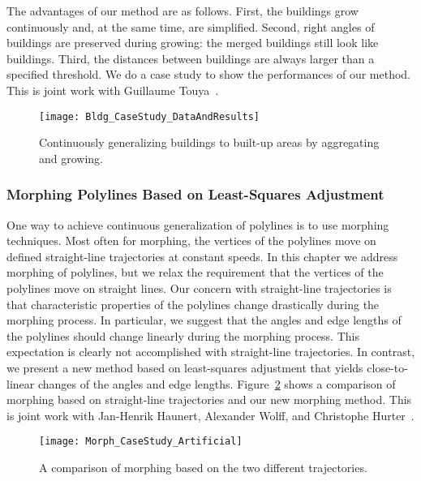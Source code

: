 The advantages of our method are as follows. 
First, the buildings grow continuously 
and, at the same time, are simplified.
Second, right angles of buildings are preserved during growing: 
the merged buildings still look like buildings. 
Third, the distances between buildings are 
always larger than a specified threshold.
We do a case study to show the performances of our method.
This is joint work with Guillaume Touya~\cite{Peng2017Building}.

\begin{figure}[tb]
	\centering
	\texttt{[image: Bldg\_CaseStudy\_DataAndResults]}
	\caption{Continuously generalizing buildings to built-up 
		areas by aggregating and growing.}
	\label{fig:Intro_BldgGrow}
\end{figure}

\subsubsection{Morphing Polylines Based on Least-Squares 
Adjustment}

One way to achieve continuous generalization of polylines is to 
use morphing 
techniques. 
Most often for morphing, the vertices of the polylines move on 
defined 
straight-line trajectories at constant speeds.
In this chapter we address morphing of polylines, but we relax 
the requirement 
that the vertices of the polylines move on straight lines. Our 
concern with 
straight-line trajectories is that characteristic properties of 
the polylines 
change drastically during the morphing process. In particular, 
we suggest that 
the angles and edge lengths of the polylines should change 
linearly during the 
morphing process. This expectation is clearly not accomplished 
with 
straight-line trajectories. In contrast, we present a new method 
based on 
least-squares adjustment that yields close-to-linear changes of 
the angles and 
edge lengths. 
Figure~\ref{fig:Intro_LSA_Compare} shows a comparison of 
morphing based on 
straight-line trajectories and our new morphing method.
This is joint work with Jan-Henrik Haunert,
Alexander Wolff, and Christophe Hurter~\cite{Peng2013LSA}.

\begin{figure}[htb]
	\centering
	\texttt{[image: Morph\_CaseStudy\_Artificial]}
	\caption{A comparison of morphing based on the two different 
	trajectories.}
	\label{fig:Intro_LSA_Compare}
\end{figure}


